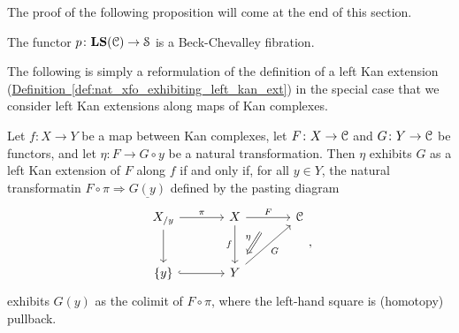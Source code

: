 \documentclass[main.tex]{subfiles}
\begin{document}
The proof of the following proposition will come at the end of this section.

\begin{proposition}
  \label{prop:local_systems_are_beck_chevalley}
  The functor $p\colon \mathbf{LS}(\mathcal{C}) \to \mathcal{S}$ is a Beck-Chevalley fibration.
\end{proposition}

The following is simply a reformulation of the definition of a left Kan extension (\hyperref[def:nat_xfo_exhibiting_left_kan_ext]{Definition~\ref*{def:nat_xfo_exhibiting_left_kan_ext}}) in the special case that we consider left Kan extensions along maps of Kan complexes.
\begin{lemma}
  \label{lemma:left_kan_ext_along_kan_complexes}
  Let $f\colon X \to Y$ be a map between Kan complexes, let $F\colon X \to \mathcal{C}$ and $G\colon Y \to \mathcal{C}$ be functors, and let $\eta\colon F \to G \circ y$ be a natural transformation. Then $\eta$ exhibits $G$ as a left Kan extension of $F$ along $f$ if and only if, for all $y \in Y$, the natural transformatin $F \circ \pi \Rightarrow \underline{G(y)}$ defined by the pasting diagram
  \begin{equation*}
    \begin{tikzcd}[row sep=large, column sep=large]
      X_{/y}
      \arrow[r, "\pi", ""{name=LA, swap}]
      \arrow[d, ""{name=LD}]
      & X
      \arrow[d, swap, "f"]
      \arrow[r, "F", ""{below, name=M}]
      & \category{C}
      \\
      \{y\}
      \arrow[r, hook, ""{name=LB}]
      & Y
      \arrow[ur, swap, "G"]
      \arrow[from=M, Rightarrow, shorten=2ex, swap, "\eta"]
    \end{tikzcd},
  \end{equation*}
  exhibits $G(y)$ as the colimit of $F \circ \pi$, where the left-hand square is (homotopy) pullback.
\end{lemma}
\end{document}
